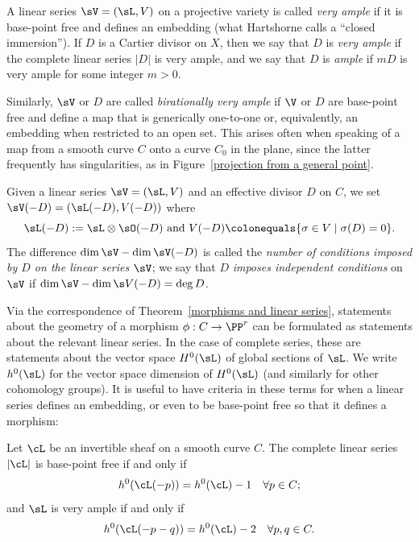 A linear series $\sV = (\sL, V)$ on a projective variety is called
\emph{very ample}
%
if it is base-point free and defines an embedding (what Hartshorne
calls a ``closed immersion''). If $D$ is a Cartier divisor on $X$,
then we say that $D$ is \emph{very ample} if the complete linear
series $|D|$ is very ample, and we say that $D$ is
\emph{ample}
%
if
$mD$ is very ample for some integer $m>0$.

Similarly, $\sV$ or $D$ are called
\emph{birationally very ample}
%
if $\V$ or $D$ are base-point free and define a map that is generically one-to-one or, equivalently,
an embedding when restricted to an open set. This arises often when speaking of a map from a smooth
curve $C$ onto a curve $C_{0}$ in the plane, since the latter frequently has singularities, as in Figure~\ref{projection from a general point}.

Given a linear series $\sV = (\sL, V)$ and an effective divisor $D$ on $C$, we  set
$
\sV(-D) = (\sL(-D),V(-D))
$
where
$$
\sL(-D): = \sL \otimes \sO(-D)\hbox{ and } V(-D) \colonequals \{ \sigma \in V \mid \sigma(D) = 0 \}.
$$
The difference $\dim \sV - \dim \sV(-D)$ is called the \emph{number of conditions imposed by $D$ on the linear series $\sV$}; we say that $D$ \emph{imposes independent conditions} on $\sV$ if $\dim \sV - \dim \s V(-D) = \deg D$.

Via the correspondence of Theorem~\ref{morphisms and linear series}, statements about the geometry of a morphism $\phi : C \to \PP^r$ can be formulated as statements about the relevant linear series. In the case of complete series, these are statements about the vector space $H^{0}(\sL)$ of global sections of $\sL$. We write $h^{0}(\sL)$ for the vector space dimension of $H^0(\sL)$ (and similarly for other cohomology groups). It is useful to have criteria
in these terms for when a linear series defines an embedding, or even to be base-point free so that it
defines a morphism:

\begin{proposition}\label{very ample}
{\rm\cite[Theorem IV.3.1]{Hartshorne1977}}
Let $\cL$ be an invertible sheaf on a smooth curve $C$. The complete linear series $|\cL|$ is base-point free if and only if
$$
h^0(\cL(-p)) = h^0(\cL) - 1 \quad \forall p \in C;
$$
and $\sL$ is very ample if and only if
$$
h^0(\cL(-p-q)) = h^0(\cL) - 2 \quad \forall p, q \in C.
\vspace*{-\parskip}
$$
\end{proposition}

